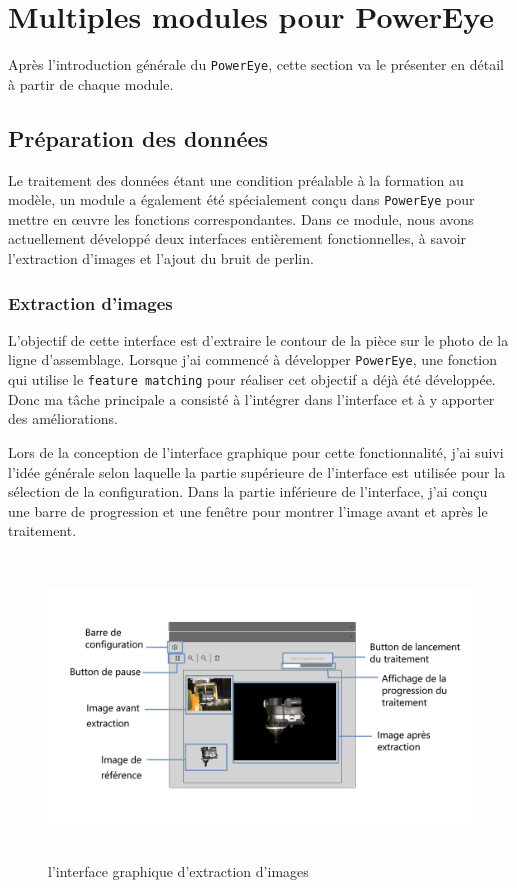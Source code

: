 \section{Multiples modules pour PowerEye}
Après l'introduction générale du \texttt{PowerEye}, cette section va le présenter en détail à partir de chaque module.

\subsection{Préparation des données}
Le traitement des données étant une condition préalable à la formation au modèle, un module a également été spécialement conçu dans \texttt{PowerEye} pour mettre en œuvre les fonctions correspondantes. Dans ce module, nous avons actuellement développé deux interfaces entièrement fonctionnelles, à savoir l'extraction d'images et l'ajout du bruit de perlin. 
\subsubsection{Extraction d'images}
L'objectif de cette interface est d'extraire le contour de la pièce sur le photo de la ligne d'assemblage. Lorsque j'ai commencé à développer \texttt{PowerEye}, une fonction qui utilise le \texttt{feature matching} pour réaliser cet objectif a déjà été développée. Donc ma tâche principale a consisté à l'intégrer dans l'interface et à y apporter des améliorations. 

Lors de la conception de l'interface graphique pour cette fonctionnalité, j'ai suivi l'idée générale selon laquelle la partie supérieure de l'interface est utilisée pour la sélection de la configuration. Dans la partie inférieure de l'interface, j'ai conçu une barre de progression et une fenêtre pour montrer l'image avant et après le traitement. 
\begin{figure}[H]
    \centering
    \includegraphics[height=8cm]{ressources/images/imageExtract.png}
    \caption{l'interface graphique d'extraction d'images}
\end{figure}


